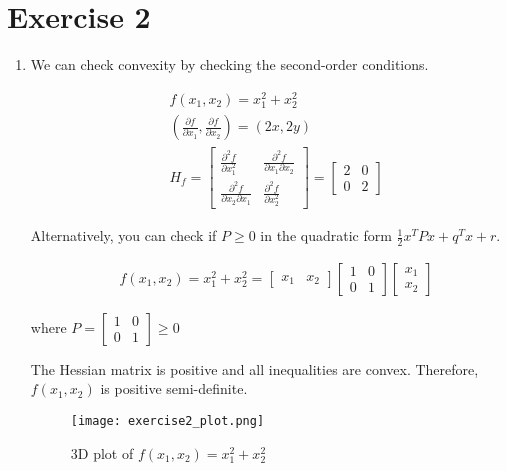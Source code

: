 \documentclass[12pt, a4paper]{article}
\begin{document}

\newpage
\section*{Exercise 2}%
\label{sec:exercise_2}

\begin{enumerate}[label={(\alph*)}, ref=\arabic*, leftmargin=0cm]
  \item We can check convexity by checking the second-order conditions.

    \begin{align*}
      &f(x_1,x_2) = x_1^2+x_2^2 \\
      &(\frac{\partial f}{\partial x_1}, \frac{\partial f}{\partial x_2}) = (2x, 2y)\\
      & H_f = \begin{bmatrix}\frac{\partial^2 f}{\partial x_1^2} & \frac{\partial^2 f}{\partial x_1 \partial x_2} \\ \frac{\partial^2 f}{\partial x_2 \partial x_1} & \frac{\partial^2 f}{\partial x_2^2}\end{bmatrix} = \begin{bmatrix}2 & 0\\0 & 2\end{bmatrix}
    \end{align*}

    Alternatively, you can check if $P \geq 0$ in the quadratic form $\frac{1}{2}x^TPx+q^Tx+r$.

    \begin{align*}
      &f(x_1, x_2) = x_1^2+x_2^2 = \begin{bmatrix}x_1 & x_2\end{bmatrix}\begin{bmatrix}1 & 0\\0 & 1\end{bmatrix}\begin{bmatrix}x_1\\x_2\end{bmatrix}
    \end{align*}

    where $P = \begin{bmatrix}1 & 0\\0 & 1\end{bmatrix} \geq 0$

    The Hessian matrix is positive and all inequalities are convex. Therefore, $f(x_1,x_2)$ is positive semi-definite.

\begin{figure}[H]
  \centering
  \texttt{[image: exercise2\_plot.png]}
  \label{fig:exercise2}
  \caption{3D plot of $f(x_1,x_2) = x_1^2+x_2^2$}
\end{figure}


\end{enumerate}
\end{document}

